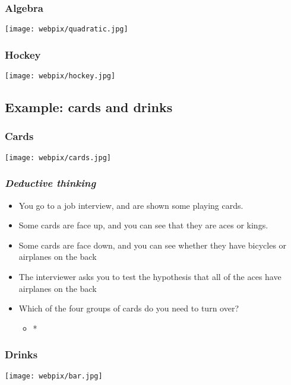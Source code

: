 \documentclass{beamer}
\begin{document}
\begin{frame}


\frametitle{{Algebra}}

\hfill\texttt{[image: webpix/quadratic.jpg]}\hfill\mbox{}
\end{frame}

\begin{frame}


\frametitle{{Hockey}}

\hfill\texttt{[image: webpix/hockey.jpg]}\hfill\mbox{}
\end{frame}


 \subsection{Example: cards and drinks}
\begin{frame}


\frametitle{{Cards}}

\hfill\texttt{[image: webpix/cards.jpg]}\hfill\mbox{}
\end{frame}

\begin{frame}


\frametitle{{\sl Deductive thinking}}\begin{itemize}

\item You go to a job interview, and are shown some playing cards.

\item Some cards are face up, and you can see that they are aces or kings.

\item Some cards are face down, and you can see whether they have bicycles
	or airplanes on the back

\item The interviewer asks you to test the hypothesis that all of the aces
	have airplanes on the back

\item Which of the four groups of cards do you need to turn over?\begin{itemize}

\item * {\color{blue} }\end{itemize}\end{itemize}
\end{frame}

\begin{frame}


\frametitle{{Drinks}}

\hfill\texttt{[image: webpix/bar.jpg]}\hfill\mbox{}
\end{frame}
\end{document}
